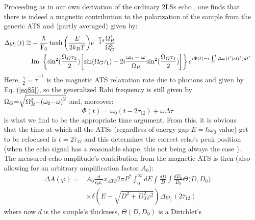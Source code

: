 \documentclass[10pt]{article}
\begin{document}
Proceeding as in our own derivation of the ordinary 2LSs echo \cite{Pal2011},  one 
finds that there is indeed a magnetic contribution to the polarization of the sample 
from the generic ATS and (partly averaged) given by:
\begin{equation}
\begin{split}
\Delta {\wp }_\parallel(t)\cong& -\frac{\hbar }{{{\rm F}}_0}\tanh  \bigg( \frac{E}{2k_B T} \bigg) e^{-\frac{\overline{\gamma }}{2}t}\frac{\Omega^4_R}{\Omega^3_G} \\
&{\rm Im}~\left\{ {\sin}^2 (\frac{{\Omega }_G{\tau }_2}{2})\bigg[{\sin ({\Omega }_G{\tau }_1) }-2i\frac{{\omega }_0-\omega }{{\Omega }_R}{{\rm sin}}^2(\frac{{\Omega }_G{\tau }_1}{2})\bigg] \right\} e^{i\Phi(t)-i\int^t_0{\Delta \omega (t')s(t')dt'}} \\
\end{split}
\label{eq930}
\end{equation}
Here, ${\frac{\overline{\gamma }}{2}=\tau }^{-1}$ is the magnetic ATS relaxation 
rate due to phonons and given by Eq. (\ref{eq85}), so the generalized Rabi frequency 
is still given by 
${\Omega }_G{\rm =}\sqrt{{\Omega }^{{\rm 2}}_R{\rm +}{{\rm (}{\omega }_0{\rm -}\omega {\rm )}}^{{\rm 2}}}$ 
and, moreover:
\begin{equation}
\Phi\left(t\right)={\omega }_0\left(t-2{\overline{\tau }}_{12}\right)+\omega \Delta \tau 
\end{equation}
is what we find to be the appropriate time argument. From this, it is obvious that the 
time at which all the ATSs (regardless of energy gap $E=\hbar {\omega }_0$ value) 
get to be refocused is $t=2{\overline{\tau }}_{12}$ and this determines the correct
echo's peak position (when the echo signal has a reasonable shape, this not being 
always the case \cite{Lud2003}). 
The measured echo amplitude's contribution from the magnetic ATS is then
(also allowing for an arbitrary amplification factor $A_0$):
\begin{equation}
\begin{split}
\Delta A\left(\varphi\right)=&A_0\frac{d}{{\varepsilon }_0{\varepsilon }_r}x_{ATS}2\pi P^*\int^{\infty }_0{dE}\int{\frac{dD}{D}}\int{\frac{dD_0}{D_0}\Theta (}D,D_0)\\
&\times \delta \left(E-\sqrt{D^2+D^2_0\varphi^2}\right)\Delta {\wp }_\parallel\left(2{\overline{\tau }}_{12}\right)
\end{split}
\label{eq932}
\end{equation}
where now $d$ is the sample's thickness, $\Theta (D,D_0)$ is a Dirichlet's
\end{document}
